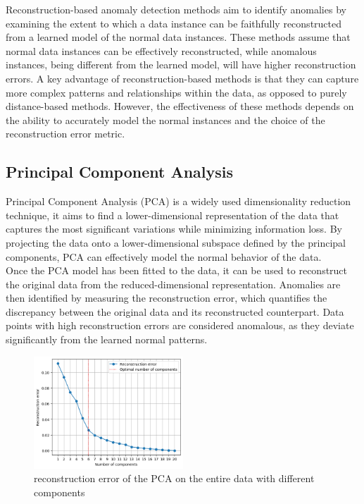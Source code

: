 \documentclass[9pt,twocolumn]{article}
\begin{document}
Reconstruction-based anomaly detection methods aim to identify anomalies by examining the extent to which a data instance can be faithfully reconstructed from a learned model of the normal data instances. These methods assume that normal data instances can be effectively reconstructed, while anomalous instances, being different from the learned model, will have higher reconstruction errors. A key advantage of reconstruction-based methods is that they can capture more complex patterns and relationships within the data, as opposed to purely distance-based methods. However, the effectiveness of these methods depends on the ability to accurately model the normal instances and the choice of the reconstruction error metric.

\subsection{Principal Component Analysis}
Principal Component Analysis (PCA) is a widely used dimensionality reduction technique, it aims to find a lower-dimensional representation of the data that captures the most significant variations while minimizing information loss. By projecting the data onto a lower-dimensional subspace defined by the principal components, PCA can effectively model the normal behavior of the data.\\
Once the PCA model has been fitted to the data, it can be used to reconstruct the original data from the reduced-dimensional representation. Anomalies are then identified by measuring the reconstruction error, which quantifies the discrepancy between the original data and its reconstructed counterpart. Data points with high reconstruction errors are considered anomalous, as they deviate significantly from the learned normal patterns.
\begin{figure}[h]
    \centering
    \includegraphics[width=0.5\textwidth]{images/PCA_errorelbow.png}
    \caption{reconstruction error of the PCA on the entire data with different components}
    \label{fig:pca_components}
 \end{figure}
\end{document}
